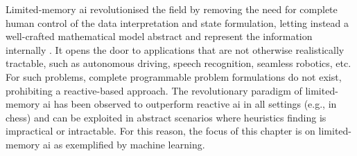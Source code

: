Limited-memory \gls{ai} revolutionised the field by removing the need for complete human control of the data interpretation and state formulation, letting instead a well-crafted mathematical model abstract and represent the information internally \cite{russel2010}. It opens the door to applications that are not otherwise realistically tractable, such as autonomous driving, speech recognition, seamless robotics, etc. For such problems, complete programmable problem formulations do not exist, prohibiting a reactive-based approach. The revolutionary paradigm of limited-memory \gls{ai} has been observed to outperform reactive \gls{ai} in all settings (e.g., in chess) and can be exploited in abstract scenarios where heuristics finding is impractical or intractable. For this reason, the focus of this chapter is on limited-memory \gls{ai} as exemplified by machine learning. 

